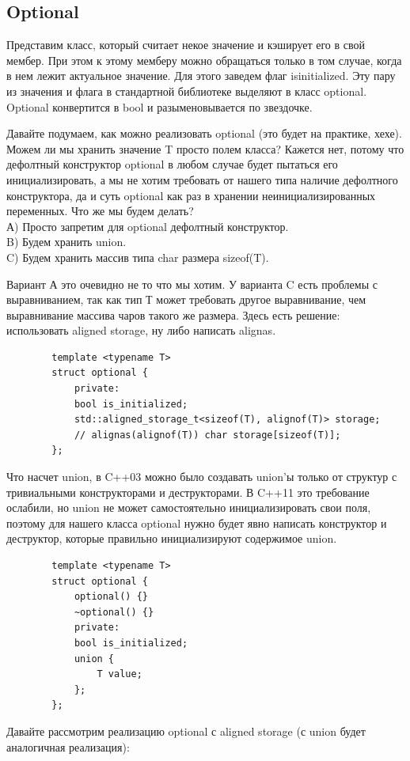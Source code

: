 \documentclass[12pt, a4paper]{article}
\begin{document}
	\subsection{Optional}
	Представим класс, который считает некое значение и кэширует его в свой мембер. При этом к этому мемберу можно обращаться только в том случае, когда в нем лежит актуальное значение. Для этого заведем флаг is\textunderscore initialized. Эту пару из значения и флага в стандартной библиотеке выделяют в класс optional. Optional конвертится в bool и разыменовывается по звездочке.
	\par Давайте подумаем, как можно реализовать optional (это будет на практике, хехе). Можем ли мы хранить значение T просто полем класса? Кажется нет, потому что дефолтный конструктор optional в любом случае будет пытаться его инициализировать, а мы не хотим требовать от нашего типа наличие дефолтного конструктора, да и суть optional как раз в хранении неинициализированных переменных. Что же мы будем делать? \\А) Просто запретим для optional дефолтный конструктор. \\B) Будем хранить union. \\C) Будем хранить массив типа char размера sizeof(T).
	\par Вариант А это очевидно не то что мы хотим. У варианта C есть проблемы с выравниванием, так как тип Т может требовать другое выравнивание, чем выравнивание массива чаров такого же размера. Здесь есть решение: использовать aligned storage, ну либо написать alignas.
	\begin{verbatim}
		template <typename T>
		struct optional {
			private:
			bool is_initialized;
			std::aligned_storage_t<sizeof(T), alignof(T)> storage;
			// alignas(alignof(T)) char storage[sizeof(T)];
		};
	\end{verbatim}
	Что насчет union, в C++03 можно было создавать union'ы только от структур с тривиальными конструкторами и деструкторами. В C++11 это требование ослабили, но union не может самостоятельно инициализировать свои поля, поэтому для нашего класса optional нужно будет явно написать конструктор и деструктор, которые правильно инициализируют содержимое union.
	\begin{verbatim}
		template <typename T>
		struct optional {
			optional() {}
			~optional() {}
			private:
			bool is_initialized;
			union {
				T value;
			};
		};
	\end{verbatim}
	Давайте рассмотрим реализацию optional с aligned storage (с union будет аналогичная реализация):
\end{document}
